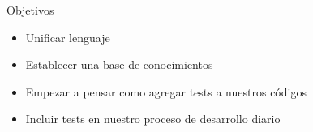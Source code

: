 
\begin{frame}{Objetivos}
    \begin{itemize}
        \item Unificar lenguaje
        \item Establecer una base de conocimientos
        \item Empezar a pensar como agregar tests a nuestros códigos
        \item Incluir tests en nuestro proceso de desarrollo diario
    \end{itemize}
\end{frame}
